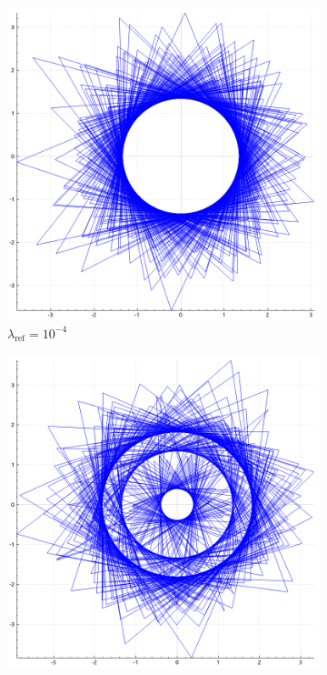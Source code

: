 \documentclass[report.tex]{subfiles}
\begin{document}
\begin{figure}
  \captionsetup{skip=0.75cm}
  \centering
  \begin{subfigure}{.25\textwidth}
    \includegraphics[width=\textwidth]{img/bps_ref_0_0001}
    \caption*{$\lambda_{\text{ref}} = 10^{-4}$}
  \end{subfigure}
  \begin{subfigure}{.25\textwidth}
    \includegraphics[width=\textwidth]{img/bps_ref_0_001}

\end{subfigure}
\end{figure}
\end{document}
